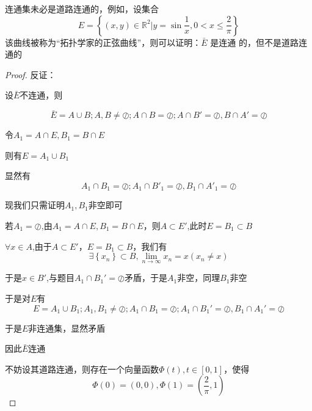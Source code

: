 \documentclass[lang=cn,10pt]{elegantbook}
\begin{document}
\begin{example}
	连通集未必是道路连通的，例如，设集合
	\begin{equation*}
		E=\left\{ \left( x,y \right) \in \mathbb{R} ^2|y=\sin \frac{1}{x},0<x\le \frac{2}{\pi} \right\}
	\end{equation*}
	该曲线被称为“拓扑学家的正弦曲线”，则可以证明：$\bar{E}$ 是连通
	的，但不是道路连通的
\end{example}
\begin{proof}
	
	反证：
	
	设$\bar{E}$不连通，则
	
	\begin{equation*}
		\bar{E}=A\cup B;A,B\ne \oslash ;A\cap B=\oslash ;A\cap B'=\oslash,B\cap A'=\oslash
	\end{equation*}
	
	令$A_{1}=A\cap E,B_{1}=B\cap E$
	
	则有$E=A_{1}\cup B_{1}$
	
	显然有
	\begin{equation*}
		A_{1}\cap B_{1}=\oslash ;A_{1}\cap B'_{1}=\oslash,B_{1}\cap A'_{1}=\oslash
	\end{equation*}
	
	现我们只需证明$A_{1},B_{1}$非空即可
	
	若$A_{1}=\oslash$,由$A_{1}=A\cap E,B_{1}=B\cap E$，则$A\subset E'$,此时$E=B_{1}\subset B$
	
	$\forall x\in A$,由于$A\subset E'$，$E=B_{1}\subset B$，我们有
	\begin{equation*}
		\exists \left\{ x_n \right\} \subset B,\underset{n\rightarrow \infty}{\lim}x_n=x\left( x_n\ne x \right)
	\end{equation*}
	
	于是$x\in B'$,与题目$A_{1}\cap B_{1}'=\oslash$矛盾，于是$A_{1}$非空，同理$B_{1}$非空
	
	于是对$E$有
	\begin{equation*}
			E=A_{1}\cup B_{1};A_{1},B_{1}\ne \oslash ;A_{1}\cap B_{1}=\oslash ;A_{1}\cap B_{1}'=\oslash,B_{1}\cap A_{1}'=\oslash
	\end{equation*}
	
	于是$E$非连通集，显然矛盾
	
	因此$\bar{E}$连通
	
	不妨设其道路连通，则存在一个向量函数$\Phi \left( t \right) ,t\in \left[ 0,1 \right] $，使得
	\begin{equation*}
		\Phi \left( 0 \right)=(0,0),\Phi \left( 1\right)=(\frac{2}{\pi},1)
	\end{equation*}
	

\end{proof}
\end{document}

